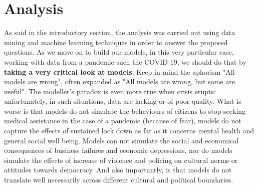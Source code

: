 \documentclass[11pt,a4paper]{article}
\begin{document}
\section{Analysis}
As said in the introductory section, the analysis was carried out using data
mining and machine learning techniques in order to answer the proposed
questions. As we move on to build our models, in this very particular case,
working with data from a pandemic such the COVID-19, we should do that by
\textbf{taking a very critical look at models}. Keep in mind the aphorism "All
models are wrong", often expanded as "All models are wrong, but some are
useful". The modeller's paradox is even more true when crisis erupts:
unfortunately, in such situations, data are lacking or of poor quality. What is
worse is that models do not simulate the behaviours of citizens to stop seeking
medical assistance in the case of a pandemic (because of fear), models do not
capture the effects of sustained lock down as far as it concerns mental health
and general social well being. Models can not simulate the social and economical
consequences of business failures and economic depressions, nor do models
simulate the effects of increase of violence and policing on cultural norms or
attitudes towards democracy. And also importantly, is that models do not
translate well necessarily across different cultural and political boundaries.
\end{document}

